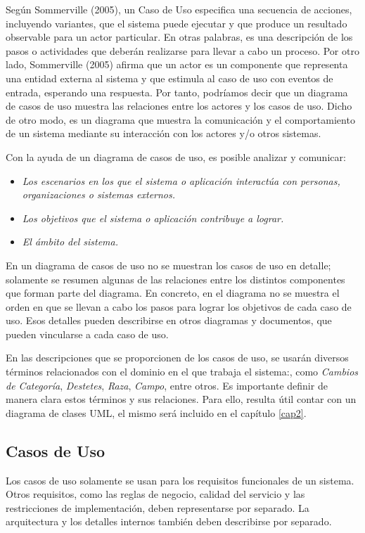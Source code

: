 \documentclass[11pt,oneside]{book}
\begin{document}
Según Sommerville (2005), un Caso de Uso especifica una secuencia de acciones, incluyendo variantes, que el sistema puede ejecutar y que produce un resultado observable para un actor particular. En otras palabras, es una descripción de los pasos o actividades que deberán realizarse para llevar a cabo un proceso. Por otro lado, Sommerville (2005) afirma que un actor es un componente que representa una entidad externa al sistema y que estimula al caso de uso con eventos de entrada, esperando una respuesta. Por tanto, podríamos decir que un diagrama de casos de uso muestra las relaciones entre los actores y los casos de uso. Dicho de otro modo, es un diagrama que muestra la comunicación y el comportamiento de un sistema mediante su interacción con los actores y/o otros sistemas.

Con la ayuda de un diagrama de casos de uso, es posible analizar y comunicar:
\begin{itemize}
\item \textit{Los escenarios en los que el sistema o aplicación interactúa con personas, organizaciones o sistemas externos.}
\item \textit{Los objetivos que el sistema o aplicación contribuye a lograr.}
\item \textit{El ámbito del sistema.}
\end{itemize}
    
En un diagrama de casos de uso no se muestran los casos de uso en detalle; solamente se resumen algunas de las relaciones entre los distintos componentes que forman parte del diagrama. En concreto, en el diagrama no se muestra el orden en que se llevan a cabo los pasos para lograr los objetivos de cada caso de uso. Esos detalles pueden describirse en otros diagramas y documentos, que pueden vincularse a cada caso de uso.

En las descripciones que se proporcionen de los casos de uso, se usarán diversos términos relacionados con el dominio en el que trabaja el sistema:, como \textit{Cambios de Categoría}, \textit{Destetes}, \textit{Raza}, \textit{Campo}, entre otros. Es importante definir de manera clara estos términos y sus relaciones. Para ello, resulta útil contar con un diagrama de clases UML, el mismo será incluido en el capítulo \ref{cap2}.

\subsection{Casos de Uso}
Los casos de uso solamente se usan para los requisitos funcionales de un sistema. Otros requisitos, como las reglas de negocio, calidad del servicio y las restricciones de implementación, deben representarse por separado. La arquitectura y los detalles internos también deben describirse por separado.
\end{document}

